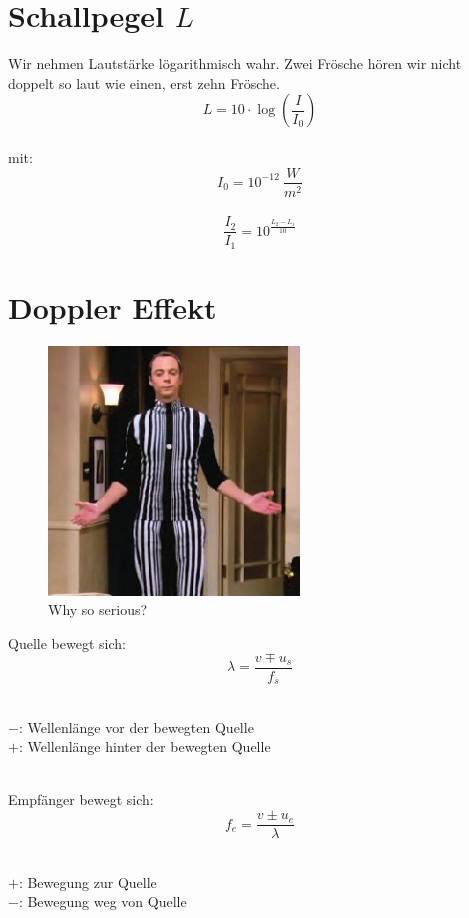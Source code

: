 \section{Schallpegel $L$}
Wir nehmen Lautstärke lögarithmisch wahr. Zwei Frösche hören wir nicht doppelt so laut wie einen, erst zehn Frösche.
\[\boxed{
	L = 10 \cdot \log \left( \frac{I}{I_0} \right)
}\]
\\
mit:
\[
	I_0 = 10^{-12}\ \frac{W}{m^2}
\]
\\
\[\boxed{
	\frac{I_2}{I_1} = 10^{\frac{L_2 - L_1}{10}}
}\]



\section{Doppler Effekt}
\begin{figure}[h!]
	\begin{center}
		\leavevmode
		\includegraphics[scale=0.4]{pic/dopplereffect.png}
		\caption{Why so serious?}
	\end{center}
\end{figure}
Quelle bewegt sich:
\[
	\lambda = \frac{v\mp u_s}{f_s}
\]\\
\begin{footnotesize}
	$-$: Wellenlänge vor der bewegten Quelle\\
	$+$: Wellenlänge hinter der bewegten Quelle\\
\end{footnotesize}
\\
Empfänger bewegt sich:
\[
	f_e = \frac{v \pm u_e}{\lambda}
\]\\
\begin{footnotesize}
	$+$: Bewegung zur Quelle\\
	$-$: Bewegung weg von Quelle\\
\end{footnotesize}
\\
